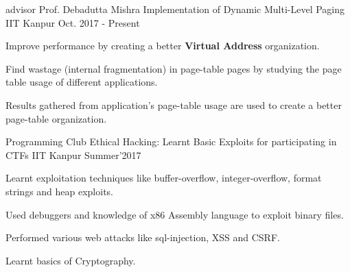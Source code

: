 

\begin{cventries}

  \cventry
    {advisor Prof. Debadutta Mishra} %
    {Implementation of Dynamic Multi-Level Paging} %
    {IIT Kanpur} %
    {Oct. 2017 - Present} %
    {
      \begin{cvitems} %
      \item {Improve performance by creating a better \textbf{Virtual Address} organization.}
        \item {Find wastage (internal fragmentation) in page-table pages by studying the page table usage of different applications.} 
        \item {Results gathered from application's page-table usage are used to create a better page-table organization.}
      \end{cvitems}
    }



  \cventry
    {Programming Club} %
    {Ethical Hacking: Learnt Basic Exploits for participating in CTFs} %
    {IIT Kanpur} %
    {Summer'2017} %
    {
      \begin{cvitems} %
        \item {Learnt exploitation techniques like buffer-overflow, integer-overflow, format strings and heap exploits.}
        \item {Used debuggers and knowledge of x86 Assembly language to exploit binary files.}
        \item {Performed various web attacks like sql-injection, XSS and CSRF.}
        \item {Learnt basics of Cryptography.}
      \end{cvitems}
    }




\end{cventries}
